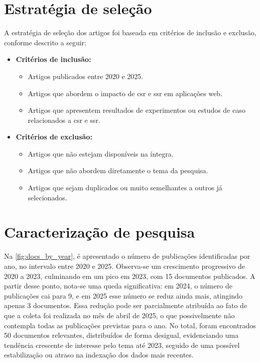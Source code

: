 \section{Estratégia de seleção}
\label{section:estrategia_selecao}
A estratégia de seleção dos artigos foi baseada em critérios de inclusão e exclusão, conforme descrito a seguir:
\begin{itemize}
    \item \textbf{Critérios de inclusão:}
    \begin{itemize}
        \item Artigos publicados entre 2020 e 2025.
        \item Artigos que abordem o impacto de \acrshort{csr} e \acrshort{ssr} em aplicações web.
        \item Artigos que apresentem resultados de experimentos ou estudos de caso relacionados a \acrshort{csr} e \acrshort{ssr}.
    \end{itemize}
    \item \textbf{Critérios de exclusão:}
    \begin{itemize}
        \item Artigos que não estejam disponíveis na íntegra.
        \item Artigos que não abordem diretamente o tema da pesquisa.
        \item Artigos que sejam duplicados ou muito semelhantes a outros já selecionados.
    \end{itemize}
\end{itemize}

\section{Caracterização de pesquisa}
\label{section:caracterizacao_pesquisa}
Na \autoref{fig:docs_by_year}, é apresentado o número de publicações identificadas por ano, no intervalo entre 2020 e 2025. Observa-se um crescimento progressivo de 2020 a 2023, culminando em um pico em 2023, com 15 documentos publicados. A partir desse ponto, nota-se uma queda significativa: em 2024, o número de publicações cai para 9, e em 2025 esse número se reduz ainda mais, atingindo apenas 3 documentos. Essa redução pode ser parcialmente atribuída ao fato de que a coleta foi realizada no mês de abril de 2025, o que possivelmente não contempla todas as publicações previstas para o ano. No total, foram encontrados 50 documentos relevantes, distribuídos de forma desigual, evidenciando uma tendência crescente de interesse pelo tema até 2023, seguido de uma possível estabilização ou atraso na indexação dos dados mais recentes.

